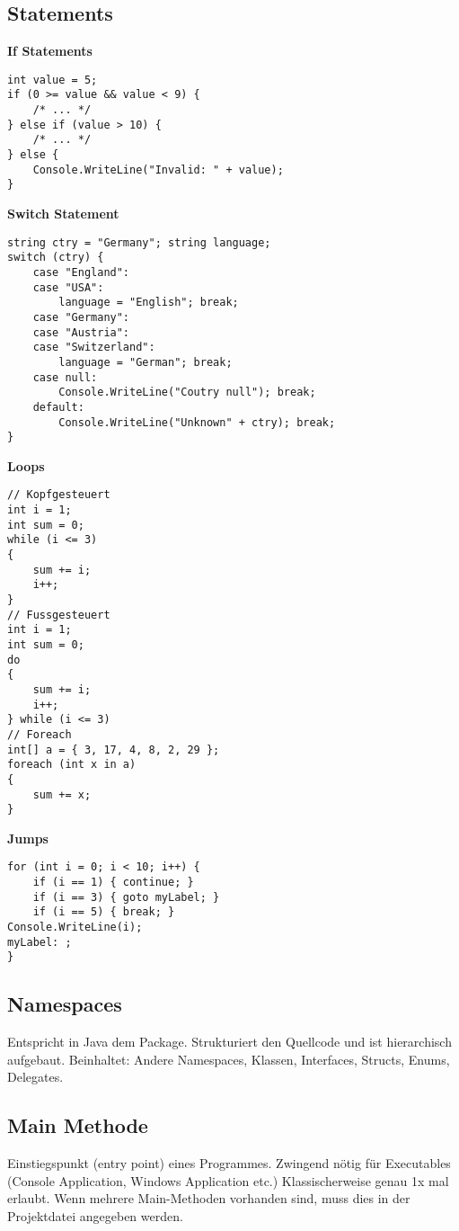 \subsection{Statements}
\begin{minipage}[]{0,5\linewidth}
\textbf{If Statements}
\begin{lstlisting}
int value = 5;
if (0 >= value && value < 9) {
	/* ... */
} else if (value > 10) {
	/* ... */
} else {
	Console.WriteLine("Invalid: " + value);
}
\end{lstlisting}
\textbf{Switch Statement} 
\begin{lstlisting}
string ctry = "Germany"; string language; 
switch (ctry) {
	case "England": 
	case "USA":
		language = "English"; break;
	case "Germany": 
	case "Austria": 
	case "Switzerland":
		language = "German"; break;
	case null:
		Console.WriteLine("Coutry null"); break;
	default:
		Console.WriteLine("Unknown" + ctry); break;
}
\end{lstlisting} 
\end{minipage}
\begin{minipage}{0,5\linewidth}
\textbf{Loops}
\begin{lstlisting}
// Kopfgesteuert
int i = 1;
int sum = 0;
while (i <= 3)
{
	sum += i; 
	i++;
}
// Fussgesteuert
int i = 1;
int sum = 0;
do
{
	sum += i; 
	i++;
} while (i <= 3)	
// Foreach
int[] a = { 3, 17, 4, 8, 2, 29 };
foreach (int x in a)
{
	sum += x;
}
\end{lstlisting}
\textbf{Jumps}
\begin{lstlisting}
for (int i = 0; i < 10; i++) {
	if (i == 1) { continue; } 
	if (i == 3) { goto myLabel; } 
	if (i == 5) { break; }
Console.WriteLine(i);
myLabel: ; 
}
\end{lstlisting} 
\end{minipage}

\subsection{Namespaces}
Entspricht in Java dem Package. Strukturiert den Quellcode und ist hierarchisch aufgebaut. Beinhaltet: Andere Namespaces, Klassen, Interfaces, Structs, Enums, Delegates.

\subsection{Main Methode}
Einstiegspunkt (entry point) eines Programmes. Zwingend nötig für Executables (Console Application, Windows Application etc.) Klassischerweise genau 1x mal erlaubt. Wenn mehrere Main-Methoden vorhanden sind, muss dies in der Projektdatei angegeben werden.

